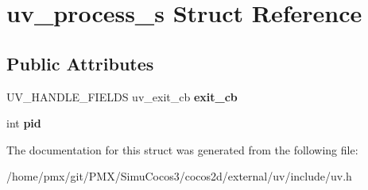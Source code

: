 \hypertarget{structuv__process__s}{}\section{uv\+\_\+process\+\_\+s Struct Reference}
\label{structuv__process__s}
\subsection*{Public Attributes}
\begin{DoxyCompactItemize}
\item 
\mbox{\label{structuv__process__s_a24ed58da1bab737fb764d5a88b4f1990}} 
U\+V\+\_\+\+H\+A\+N\+D\+L\+E\+\_\+\+F\+I\+E\+L\+DS uv\+\_\+exit\+\_\+cb {\bfseries exit\+\_\+cb}
\item 
\mbox{\label{structuv__process__s_a1878d6a869c27bedf21ebcea560e74dc}} 
int {\bfseries pid}
\end{DoxyCompactItemize}


The documentation for this struct was generated from the following file\+:\begin{DoxyCompactItemize}
\item 
/home/pmx/git/\+P\+M\+X/\+Simu\+Cocos3/cocos2d/external/uv/include/uv.\+h\end{DoxyCompactItemize}
